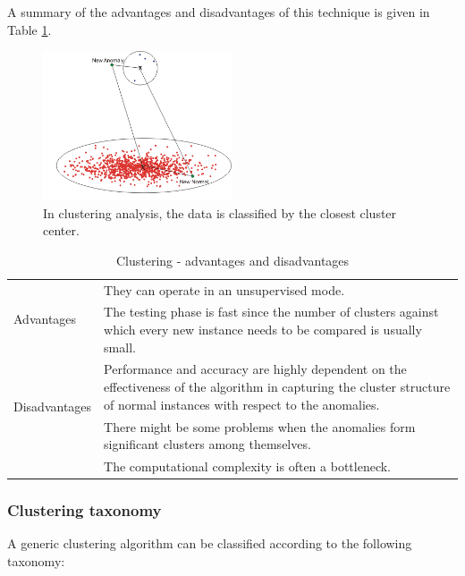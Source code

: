 \documentclass[12pt,a4paper,cucitura]{toptesi}
\begin{document}
A summary of the advantages and disadvantages of this technique is given in Table \ref{tab-cluster}.

\begin{figure}
\centering
\includegraphics[width=0.5\textwidth]{clusters.png}
\caption[Clustering example]{In clustering analysis, the data is classified by the closest cluster center.}
\end{figure}

\begin{table}
\centering
\begin{tabular}{l|p{12cm}}
\hline
\hline
\multirow{2}{*}{Advantages} & They can operate in an unsupervised mode. \\
\cline{2-2}
& The testing phase is fast since the number of clusters against which every new instance needs to be compared is usually small. \\ 
\hline
\multirow{2}{*}{Disadvantages} & Performance and accuracy are highly dependent on the effectiveness of the algorithm in capturing the cluster structure of normal instances with respect to the anomalies. \\
\cline{2-2}
& There might be some problems when the anomalies form significant clusters among themselves. \\	
\cline{2-2}
& The computational complexity is often a bottleneck. \\
\hline
\hline
\end{tabular}
\caption{Clustering - advantages and disadvantages}
\label{tab-cluster}
\end{table}

\subsubsection{Clustering taxonomy}

A generic clustering algorithm can be classified according to the following taxonomy:
\end{document}
